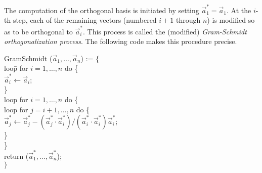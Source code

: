 The computation of the orthogonal basis is initiated by setting
$\vec{a}^{\ast}_1 = \vec{a}_1$.  At the $i$-th step, each of the
remaining vectors (numbered $i+1$ through $n$) is modified so as to be
orthogonal to $\vec{a}^{\ast}_i$.  This process is called the
(modified) {\em Gram-Schmidt orthogonalization
process}. The following code makes this
procedure precise.

\begindsacode
GramSchmidt ($\vec{a}_1, \ldots, \vec{a}_n$) := $\{$\\
\>loo\=p for $i = 1, \ldots, n$  do \{ \\
\>\> $\vec{a}^{\ast}_i \leftarrow \vec{a}_i$; \\
\>\> \} \\
\>loop for $i = 1, \ldots, n$  do \{ \\
\>\> loo\=p for $j = i+1, \ldots, n$ do \{\\
\>\> \> $\vec{a}^{\ast}_j \leftarrow \vec{a}^{\ast}_j 
     - (\vec{a}^{\ast}_j \cdot \vec{a}^{\ast}_i)/(\vec{a}^{\ast}_i \cdot \vec{a}^{\ast}_i) \vec{a}^{\ast}_i$; \\
\>\>\> \} \\
\>\> \} \\
\>return ($\vec{a}^{\ast}_1, \ldots, \vec{a}^{\ast}_n$); \\
\>$\}$
\enddsacode

